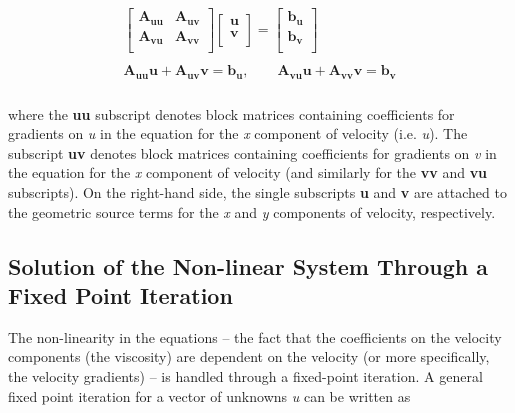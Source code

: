 \begin{align*}
\begin{matrix}
  \left[ \begin{matrix}
   \mathbf{A}_{\mathbf{uu}} & \mathbf{A}_{\mathbf{uv}}  \\
   \mathbf{A}_{\mathbf{vu}} & \mathbf{A}_{\mathbf{vv}}  \\
\end{matrix} \right]\left[ \begin{matrix}
   \mathbf{u}  \\
   \mathbf{v}  \\
\end{matrix} \right]=\left[ \begin{matrix}
   \mathbf{b}_{\mathbf{u}}  \\
   \mathbf{b}_{\mathbf{v}}  \\
\end{matrix} \right] \\ 
   \\ 
  \mathbf{A}_{\mathbf{uu}}\mathbf{u} + \mathbf{A}_{\mathbf{uv}}\mathbf{v} =\mathbf{b}_{\mathbf{u}},
  \quad \quad \mathbf{A}_{\mathbf{vu}}\mathbf{u} + \mathbf{A}_{\mathbf{vv}}\mathbf{v} =\mathbf{b}_{\mathbf{v}} \\ 
\end{matrix}
\end{align*}

where the \textbf{uu} subscript denotes block matrices containing coefficients for gradients on \textit{u} in the equation for the \textit{x} component of velocity (i.e. \textit{u}). The subscript \textbf{uv} denotes block matrices containing coefficients for gradients on \textit{v} in the equation for the \textit{x} component of velocity (and similarly for the \textbf{vv} and \textbf{vu} subscripts). On the right-hand side, the single subscripts \textbf{u} and \textbf{v} are attached to the geometric source terms for the \textit{x} and \textit{y} components of velocity, respectively.

\subsection{Solution of the Non-linear System Through a Fixed Point Iteration}
The non-linearity in the equations -- the fact that the coefficients on the velocity components (the viscosity) are dependent on the velocity (or more specifically, the velocity gradients) -- is handled through a fixed-point iteration. A general fixed point iteration for a vector of unknowns \textit{u} can be written as 

